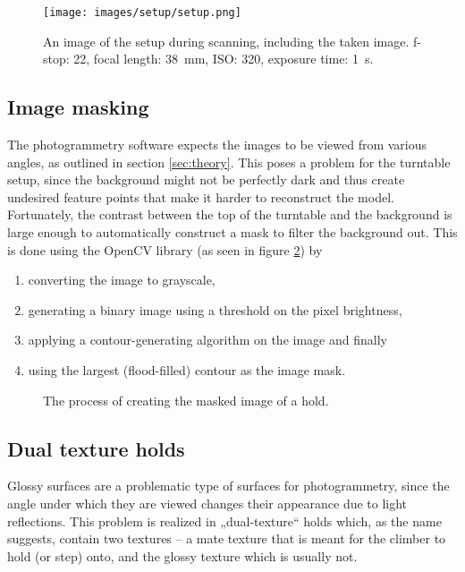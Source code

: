 \begin{figure}
	\centering
	\texttt{[image: images/setup/setup.png]}
	\caption{An image of the setup during scanning, including the taken image. f-stop: 22, focal length: \SI{38}{\milli\meter}, ISO: 320, exposure time: \SI{1}{\second}.}
	  
	\label{fig:setup}
\end{figure}

\subsection{Image masking}
The photogrammetry software expects the images to be viewed from various angles, as outlined in section \ref{sec:theory}.
This poses a problem for the turntable setup, since the background might not be perfectly dark and thus create undesired feature points that make it harder to reconstruct the model.
Fortunately, the contrast between the top of the turntable and the background is large enough to automatically construct a mask to filter the background out.
This is done using the OpenCV library (as seen in figure \ref{fig:mask}) by
\begin{enumerate}
	\item converting the image to grayscale,
	\item generating a binary image using a threshold on the pixel brightness,
	\item applying a contour-generating algorithm \cite{suzuki1985topological} on the image and finally
	\item using the largest (flood-filled) contour as the image mask.
\end{enumerate}

\begin{figure}
	\centering
	\hfill
	\hfill
	\hfill
	\caption{The process of creating the masked image of a hold.}%
	\label{fig:mask}
\end{figure}

\subsection{Dual texture holds}\label{sec:dual}
Glossy surfaces are a problematic type of surfaces for photogrammetry, since the angle under which they are viewed changes their appearance due to light reflections.
This problem is realized in „dual-texture“ holds which, as the name suggests, contain two textures -- a mate texture that is meant for the climber to hold (or step) onto, and the glossy texture which is usually not.

